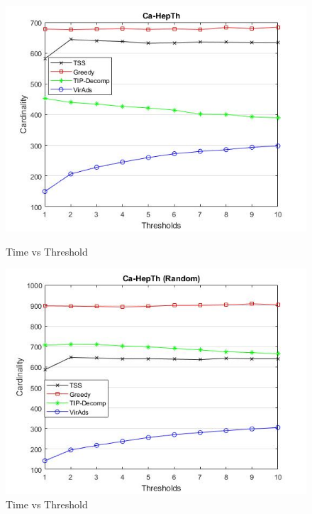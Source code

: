 \begin{figure}[h!]
\begin{minipage}[t]{0.50\textwidth}
\includegraphics[width=\linewidth,keepaspectratio=true]{images/ca-hepthtime.jpg}
\caption{Time vs Threshold}

\end{minipage}
\begin{minipage}[t]{0.50\textwidth}
\includegraphics[width=\linewidth,keepaspectratio=true]{images/ca-hepthrandomtime.jpg}
\caption{Time vs Threshold}
\end{minipage}
\end{figure}
	
